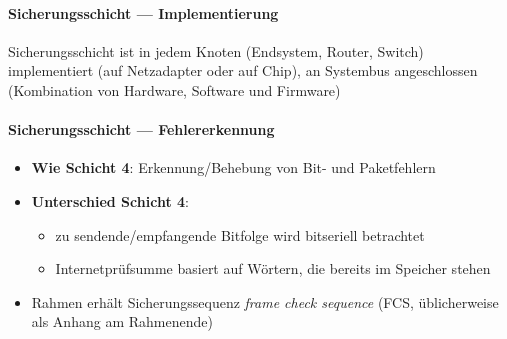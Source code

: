 \paragraph{Sicherungsschicht --- Implementierung}
Sicherungsschicht ist in jedem Knoten (Endsystem, Router, Switch) implementiert (auf Netzadapter oder auf Chip), an Systembus angeschlossen (Kombination von Hardware, Software und Firmware)

\paragraph{Sicherungsschicht --- Fehlererkennung}
\begin{itemize}
  \item \textbf{Wie Schicht 4}: Erkennung/Behebung von Bit- und Paketfehlern
  \item \textbf{Unterschied Schicht 4}:
  \begin{itemize}
    \item zu sendende/empfangende Bitfolge wird bitseriell betrachtet
    \item Internetprüfsumme basiert auf Wörtern, die bereits im Speicher stehen
  \end{itemize}
  \item Rahmen erhält Sicherungssequenz \emph{frame check sequence} (FCS, üblicherweise als Anhang am Rahmenende)
\end{itemize}

